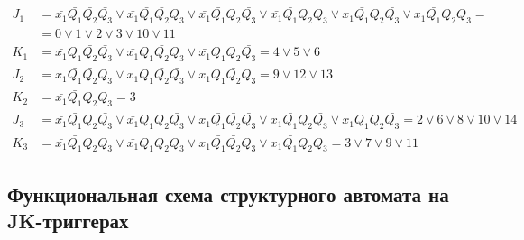 \documentclass[12pt, a4paper]{article}
\begin{document}
\begin{align*}
  J_1 &= \bar{x_1}\bar{Q_1}\bar{Q_2}\bar{Q_3} \lor \bar{x_1}\bar{Q_1}\bar{Q_2}Q_3 \lor \bar{x_1}\bar{Q_1}Q_2\bar{Q_3} \lor \bar{x_1}\bar{Q_1}Q_2Q_3 \lor x_1\bar{Q_1}Q_2\bar{Q_3} \lor x_1\bar{Q_1}Q_2Q_3 =\\
  &= 0 \lor 1 \lor 2 \lor 3 \lor 10 \lor 11\\
  K_1 &= \bar{x_1}Q_1\bar{Q_2}\bar{Q_3} \lor \bar{x_1}Q_1\bar{Q_2}Q_3 \lor \bar{x_1}Q_1Q_2\bar{Q_3} = 4 \lor 5 \lor 6\\
  J_2 &= x_1\bar{Q_1}\bar{Q_2}Q_3 \lor x_1Q_1\bar{Q_2}\bar{Q_3} \lor x_1Q_1\bar{Q_2}Q_3 = 9 \lor 12 \lor 13\\
  K_2 &= \bar{x_1}\bar{Q_1}Q_2Q_3 = 3\\
  J_3 &= \bar{x_1}\bar{Q_1}Q_2\bar{Q_3} \lor \bar{x_1}Q_1Q_2\bar{Q_3} \lor x_1\bar{Q_1}\bar{Q_2}\bar{Q_3} \lor x_1\bar{Q_1}Q_2\bar{Q_3} \lor x_1Q_1Q_2\bar{Q_3} = 2 \lor 6 \lor 8 \lor 10 \lor 14\\
  K_3 &= \bar{x_1}\bar{Q_1}Q_2Q_3 \lor \bar{x_1}Q_1Q_2Q_3 \lor x_1\bar{Q_1}\bar{Q_2}Q_3 \lor x_1\bar{Q_1}Q_2Q_3 = 3 \lor 7 \lor 9 \lor 11
\end{align*}

\subsection*{Функциональная схема структурного автомата на JK-триггерах}
\end{document}
